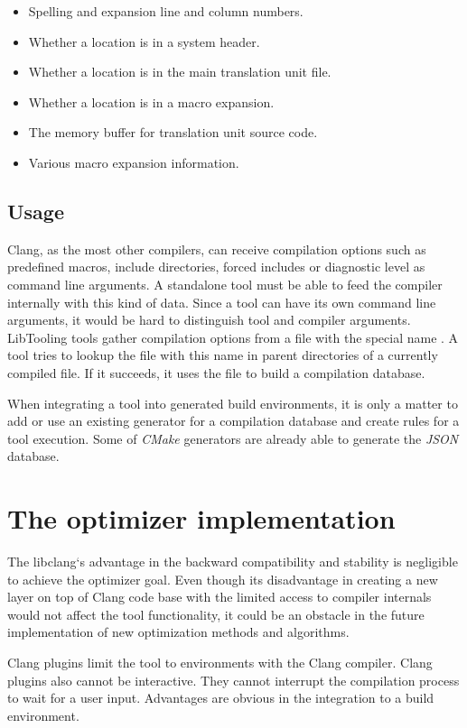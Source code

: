 \begin{itemize}
\item Spelling and expansion line and column numbers.
\item Whether a location is in a system header.
\item Whether a location is in the main translation unit file.
\item Whether a location is in a macro expansion.
\item The memory buffer for translation unit source code.
\item Various macro expansion information.
\end{itemize}

\subsection{Usage}
Clang, as the most other compilers, can receive compilation options such as predefined macros, include directories, forced includes or diagnostic level as command line arguments. A standalone tool must be able to feed the compiler internally with this kind of data. Since a tool can have its own command line arguments, it would be hard to distinguish tool and compiler arguments. LibTooling tools gather compilation options from a file with the special name . A tool tries to lookup the file with this name in parent directories of a currently compiled file. If it succeeds, it uses the file to build a compilation database.

When integrating a tool into generated build environments, it is only a matter to add or use an existing generator for a compilation database and create rules for a tool execution. Some of \emph{CMake} \cite{cmake} generators are already able to generate the \emph{JSON} database.

\section{The optimizer implementation}
\label{clang-optimizer}
The libclang`s advantage in the backward compatibility and stability is negligible to achieve the optimizer goal. Even though its disadvantage in creating a new layer on top of Clang code base with the limited access to compiler internals would not affect the tool functionality, it could be an obstacle in the future implementation of new optimization methods and algorithms.

Clang plugins limit the tool to environments with the Clang compiler. Clang plugins also cannot be interactive. They cannot interrupt the compilation process to wait for a user input. Advantages are obvious in the integration to a build environment.

